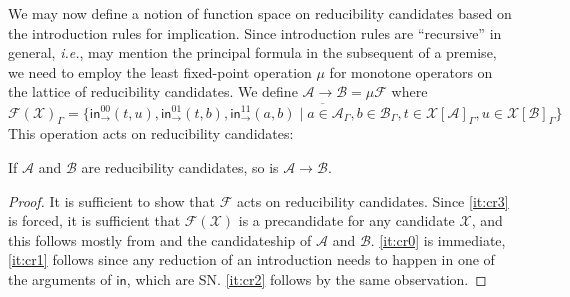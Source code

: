 \documentclass[a4paper,USenglish,cleveref, autoref, thm-restate]{lipics-v2019}
\newcommand{\ie}{\emph{i.e.}\xspace}
\newcommand{\tin}{\ensuremath{\mathsf{in}}}
\newcommand{\inn}[2]{\ensuremath{\tin_{#1}^{#2}}}
\newcommand{\cl}[1]{\overline{#1}}
\newcommand{\A}{\mathcal{A}}
\newcommand{\B}{\mathcal{B}}
\newcommand{\F}{\mathcal{F}}
\newcommand{\X}{\mathcal{X}}
\begin{document}
We may now define a notion of function space on reducibility
candidates based on the introduction rules for implication.  Since
introduction rules are ``recursive'' in general, \ie, may mention the
principal formula in the subsequent of a premise, we need to employ
the least fixed-point operation $\mu$ for monotone operators on the
lattice of reducibility candidates.
We define $\A \to \B = \mu\F$ where
\[
  \F(\X)_\Gamma =
  \cl{\{
    \inn\to{00}(t,u),
    \inn\to{01}(t,b),
    \inn\to{11}(a,b) \mid
      a \in \A_\Gamma,
      b \in \B_\Gamma,
      t \in \X[\A]_\Gamma,
      u \in \X[\B]_\Gamma
  \}}
\]
This operation acts on reducibility candidates:
\begin{lemma}
  \label{lem:fun}
  If $\A$ and $\B$ are reducibility candidates, so is $\A \to \B$.
\end{lemma}
\begin{proof}
  It is sufficient to show that $\F$ acts on reducibility candidates.
  Since \ref{it:cr3} is forced, it is sufficient that $\F(\X)$ is a
  precandidate for any candidate $\X$, and this follows mostly from
   and the candidateship of $\A$ and $\B$.
  \ref{it:cr0} is immediate, \ref{it:cr1} follows since any reduction of an introduction
  needs to happen in one of the arguments of $\tin$, which are SN.
  \ref{it:cr2} follows by the same observation.
\end{proof}
\end{document}
